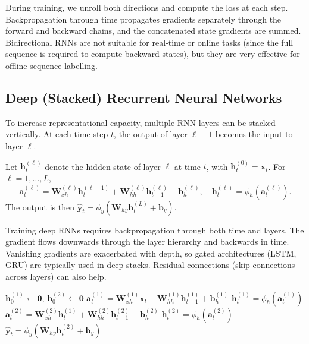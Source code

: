 \documentclass{tufte-handout}
\begin{document}
During training, we unroll both directions and compute the loss at each step. Backpropagation through time propagates gradients separately through the forward and backward chains, and the concatenated state gradients are summed. Bidirectional RNNs are not suitable for real‑time or online tasks (since the full sequence is required to compute backward states), but they are very effective for offline sequence labelling.

\subsection{Deep (Stacked) Recurrent Neural Networks}

To increase representational capacity, multiple RNN layers can be stacked vertically. At each time step $t$, the output of layer $\ell-1$ becomes the input to layer $\ell$.

\begin{defn}
    Let $\mathbf{h}_t^{(\ell)}$ denote the hidden state of layer $\ell$ at time $t$, with $\mathbf{h}_t^{(0)} = \mathbf{x}_t$. For $\ell = 1,\dots,L$,
    \[
    \mathbf{a}_t^{(\ell)} = \mathbf{W}_{xh}^{(\ell)} \mathbf{h}_t^{(\ell-1)} + \mathbf{W}_{hh}^{(\ell)} \mathbf{h}_{t-1}^{(\ell)} + \mathbf{b}_h^{(\ell)},\quad
    \mathbf{h}_t^{(\ell)} = \phi_h(\mathbf{a}_t^{(\ell)}).
    \]
    The output is then $\hat{\mathbf{y}}_t = \phi_y(\mathbf{W}_{hy} \mathbf{h}_t^{(L)} + \mathbf{b}_y)$.
\end{defn}

Training deep RNNs requires backpropagation through both time and layers. The gradient flows downwards through the layer hierarchy and backwards in time. Vanishing gradients are exacerbated with depth, so gated architectures (LSTM, GRU) are typically used in deep stacks. Residual connections (skip connections across layers) can also help.

\begin{algorithm}[h]
    \caption{Forward pass for a stacked RNN (2 layers)}
    \begin{algorithmic}[1]
        \State $\mathbf{h}_0^{(1)} \gets \mathbf{0}$, $\mathbf{h}_0^{(2)} \gets \mathbf{0}$
            \State $\mathbf{a}_t^{(1)} = \mathbf{W}_{xh}^{(1)}\mathbf{x}_t + \mathbf{W}_{hh}^{(1)}\mathbf{h}_{t-1}^{(1)} + \mathbf{b}_h^{(1)}$
            \State $\mathbf{h}_t^{(1)} = \phi_h(\mathbf{a}_t^{(1)})$
            \State $\mathbf{a}_t^{(2)} = \mathbf{W}_{xh}^{(2)}\mathbf{h}_t^{(1)} + \mathbf{W}_{hh}^{(2)}\mathbf{h}_{t-1}^{(2)} + \mathbf{b}_h^{(2)}$
            \State $\mathbf{h}_t^{(2)} = \phi_h(\mathbf{a}_t^{(2)})$
            \State $\hat{\mathbf{y}}_t = \phi_y(\mathbf{W}_{hy}\mathbf{h}_t^{(2)} + \mathbf{b}_y)$
        \EndFor
    \end{algorithmic}
\end{algorithm}
\end{document}
